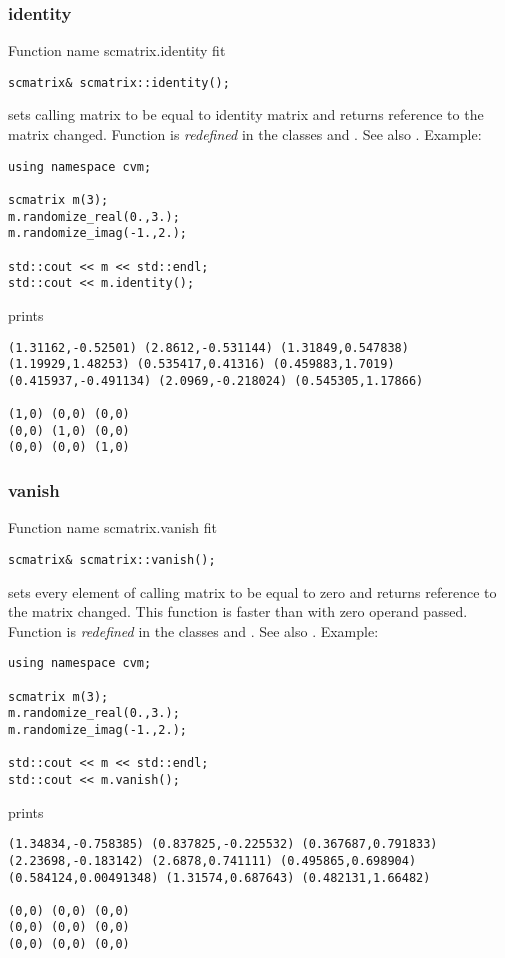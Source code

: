 \subsubsection{identity}
Function%
\pdfdest name {scmatrix.identity} fit
\begin{verbatim}
scmatrix& scmatrix::identity();
\end{verbatim}
sets  calling matrix to be equal to identity matrix
and returns  reference to
the matrix changed. 
Function is \emph{redefined} in the classes
 and
.
See also .
Example:
\begin{Verbatim}
using namespace cvm;

scmatrix m(3);
m.randomize_real(0.,3.);
m.randomize_imag(-1.,2.);

std::cout << m << std::endl;
std::cout << m.identity();
\end{Verbatim}
prints
\begin{Verbatim}
(1.31162,-0.52501) (2.8612,-0.531144) (1.31849,0.547838)
(1.19929,1.48253) (0.535417,0.41316) (0.459883,1.7019)
(0.415937,-0.491134) (2.0969,-0.218024) (0.545305,1.17866)

(1,0) (0,0) (0,0)
(0,0) (1,0) (0,0)
(0,0) (0,0) (1,0)
\end{Verbatim}
\newpage



\subsubsection{vanish}
Function%
\pdfdest name {scmatrix.vanish} fit
\begin{verbatim}
scmatrix& scmatrix::vanish();
\end{verbatim}
sets every element of  calling matrix to be equal to zero
and returns  reference to
the matrix changed. This function is faster
than
with zero operand passed.
Function is \emph{redefined} in the classes
 and
.
See also .
Example:
\begin{Verbatim}
using namespace cvm;

scmatrix m(3);
m.randomize_real(0.,3.);
m.randomize_imag(-1.,2.);

std::cout << m << std::endl;
std::cout << m.vanish();
\end{Verbatim}
prints
\begin{Verbatim}
(1.34834,-0.758385) (0.837825,-0.225532) (0.367687,0.791833)
(2.23698,-0.183142) (2.6878,0.741111) (0.495865,0.698904)
(0.584124,0.00491348) (1.31574,0.687643) (0.482131,1.66482)

(0,0) (0,0) (0,0)
(0,0) (0,0) (0,0)
(0,0) (0,0) (0,0)
\end{Verbatim}
\newpage



